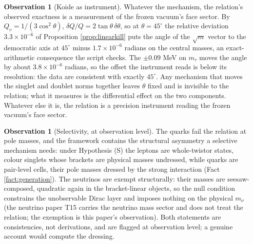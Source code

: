 \documentclass[11pt]{article}
\theoremstyle{definition}
\newtheorem{observation}[theorem]{Observation}
\begin{document}
\begin{observation}[Koide as instrument]\label{obs:instrument}
Whatever the mechanism, the relation's observed exactness is a measurement of the frozen vacuum's face sector. By $Q_{v} = 1/(3\cos^{2}\theta)$, $\delta Q/Q = 2\tan\theta\,\delta\theta$, so at $\theta = 45^{\circ}$ the relative deviation $3.3 \times 10^{-6}$ of Proposition \ref{prop:linearkill} puts the angle of the $\sqrt{m}$ vector to the democratic axis at $45^{\circ}$ minus $1.7 \times 10^{-6}$ radians on the central masses, an exact-arithmetic consequence the script checks. The $\pm 0.09$ MeV on $m_{\tau}$ moves the angle by about $3.8 \times 10^{-6}$ radians, so the offset the instrument reads is below its resolution: the data are consistent with exactly $45^{\circ}$. Any mechanism that moves the singlet and doublet norms together leaves $\theta$ fixed and is invisible to the relation; what it measures is the differential effect on the two components. Whatever else it is, the relation is a precision instrument reading the frozen vacuum's face sector.
\end{observation}

\begin{observation}[Selectivity, at observation level]\label{obs:selectivity}
The quarks fail the relation at pole masses, and the framework contains the structural asymmetry a selective mechanism needs: under Hypothesis (S) the leptons are whole-twistor states, colour singlets whose brackets are physical masses undressed, while quarks are pair-level cells, their pole masses dressed by the strong interaction (Fact \ref{fact:generation}). The neutrinos are exempt structurally: their masses are seesaw-composed, quadratic again in the bracket-linear objects, so the null condition constrains the unobservable Dirac layer and imposes nothing on the physical $m_{\nu}$ (the neutrino paper T15 \cite{ButlerT15} carries the neutrino mass sector and does not treat the relation; the exemption is this paper's observation). Both statements are consistencies, not derivations, and are flagged at observation level; a genuine account would compute the dressing.
\end{observation}
\end{document}
